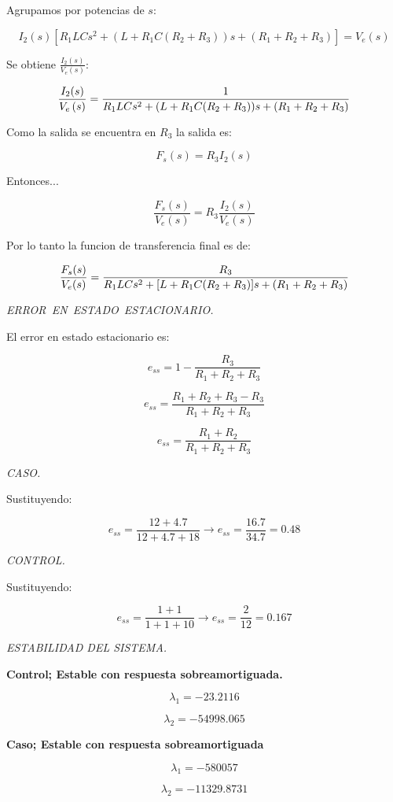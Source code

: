 \documentclass{article}
\begin{document}
Agrupamos por potencias de $s:$

\[
I_{2}(s)[R_{1}LCs^{2}+(L+R_{1}C(R_{2}+R_{3}))s+(R_{1}+R_{2}+R_{3})]=V_{e}%
\left( s\right) 
\]

Se obtiene $\frac{I_{2}(s)}{V_{e}\left( s\right) }:$

\[
\frac{I_{2}(s)}{V_{e}\left( s\right) }=\frac{1}{%
R_{1}LCs^{2}+(L+R_{1}C(R_{2}+R_{3}))s+(R_{1}+R_{2}+R_{3})} 
\]

Como la salida se encuentra en $R_{3}$ la salida es:

\[
F_{s}(s)=R_{3}I_{2}\left( s\right) 
\]

Entonces...

\[
\frac{F_{s}(s)}{V_{e}(s)}=R_{3}\frac{I_{2}(s)}{V_{e}(s)} 
\]

Por lo tanto la funcion de transferencia final es de:

\[
\frac{F_{s}(s)}{V_{e}(s)}=\frac{R_{3}}{%
R_{1}LCs^{2}+[L+R_{1}C(R_{2}+R_{3})]s+(R_{1}+R_{2}+R_{3})} 
\]

\bigskip

\emph{ERROR\ EN\ ESTADO\ ESTACIONARIO.}

El error en estado estacionario es:

\[
e_{ss}=1-\frac{R_{3}}{R_{1}+R_{2}+R_{3}}
\]

\[
e_{ss}=\frac{R_{1}+R_{2}+R_{3}-R_{3}}{R_{1}+R_{2}+R_{3}}
\]

\[
e_{ss}=\frac{R_{1}+R_{2}}{R_{1}+R_{2}+R_{3}}
\]

\emph{CASO.}

Sustituyendo:

\[
e_{ss}=\frac{12+4.7}{12+4.7+18}\rightarrow e_{ss}=\frac{16.7}{34.7}=0.48
\]

\emph{CONTROL.}

Sustituyendo:

\[
e_{ss}=\frac{1+1}{1+1+10}\rightarrow e_{ss}=\frac{2}{12}=0.167
\]

\emph{ESTABILIDAD DEL SISTEMA.}

\textbf{Control; Estable con respuesta sobreamortiguada.}

\[
\lambda _{1}=-23.2116
\]

\[
\lambda _{2}=-54998.065
\]

\textbf{Caso; Estable con respuesta sobreamortiguada}

\[
\lambda _{1}=-580057
\]

\[
\lambda _{2}=-11329.8731
\]
\end{document}
